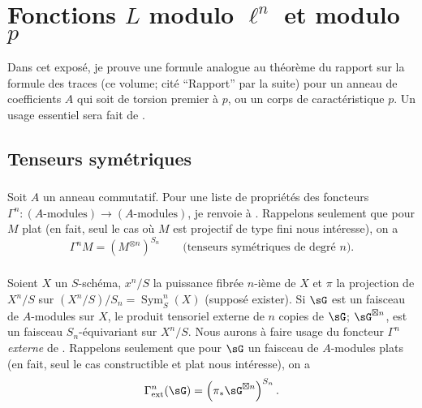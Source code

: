 
\chapter{Fonctions \texorpdfstring{$L$}{L} modulo \texorpdfstring{$\ell^n$}{l n} et modulo \texorpdfstring{$p$}{p}}\label{III}

Dans cet exposé, je prouve une formule analogue au théorème du rapport sur 
la formule des traces (ce volume; cité ``Rapport'' par la suite) pour un 
anneau de coefficients $A$ qui soit de torsion premier à $p$, ou un corps de 
caractéristique $p$. Un usage essentiel sera fait de \cite[XVII 5.5]{sga4}. 










\section{Tenseurs symétriques}\label{III:1}





\subsection{}\label{III:1-1}

Soit $A$ un anneau commutatif. Pour une liste de propriétés des foncteurs 
$\Gamma^n:(\text{$A$-modules})\to (\text{$A$-modules})$, je renvoie à 
\cite[XVII 5.5.1 et 2]{sga4}. Rappelons seulement que pour $M$ plat (en fait, seul 
le cas où $M$ est projectif de type fini nous intéresse), on a 
\[
  \Gamma^n M = \left(M^{\otimes n}\right)^{S_n} \qquad \text{(tenseurs symétriques de degré $n$).}
\]





\subsection{}\label{III:1-2}

Soient $X$ un $S$-schéma, $x^n/S$ la puissance fibrée $n$-ième de $X$ et 
$\pi$ la projection de $X^n/S$ sur $(X^n/S)/S_n=\operatorname{Sym}_S^n(X)$ 
(supposé exister). Si $\sG$ est un faisceau de $A$-modules sur $X$, le 
produit tensoriel externe de $n$ copies de $\sG$; $\sG^{\boxtimes n}$, est un 
faisceau $S_n$-équivariant sur $X^n/S$. Nous aurons à faire usage du 
foncteur $\Gamma^n$ \emph{externe} de \cite[XVII 5.5.7 à 9]{sga4}. Rappelons 
seulement que pour $\sG$ un faisceau de $A$-modules plats (en fait, seul le cas 
constructible et plat nous intéresse), on a 
\[
  \Gamma_\text{ext}^n(\sG) = \left(\pi_*\sG^{\boxtimes n}\right)^{S_n} \text{.}
\]





